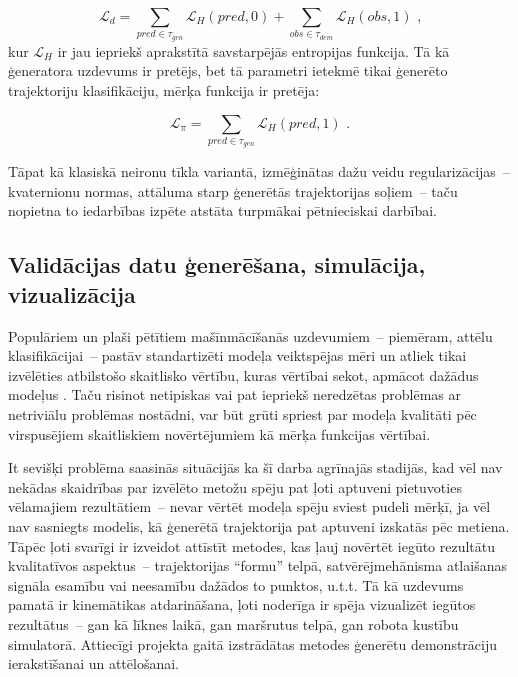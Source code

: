 \documentclass[12pt, a4paper]{article}
\numberwithin{equation}{section} %
\begin{document}
\begin{equation}
    \mathcal{L}_{d} = \sum_{pred \in \tau_{gen}} \mathcal{L}_H(pred,0) + 
    \sum_{obs \in \tau_{dem}} \mathcal{L}_H(obs,1) 
\text{ ,}
\end{equation}
kur $\mathcal{L}_H$ ir jau iepriekš aprakstītā savstarpējās entropijas funkcija. Tā kā ģeneratora uzdevums ir pretējs, bet tā parametri ietekmē tikai ģenerēto trajektoriju klasifikāciju, mērķa funkcija ir pretēja:

\begin{equation}
    \mathcal{L}_{\pi} = \sum_{pred \in \tau_{gen}} \mathcal{L}_H(pred,1) 
\text{ .}
\end{equation}

Tāpat kā klasiskā neironu tīkla variantā, izmēģinātas dažu veidu regularizācijas~-- kvaternionu normas, attāluma starp ģenerētās trajektorijas soļiem~-- taču nopietna to iedarbības izpēte atstāta turpmākai pētnieciskai darbībai.

\subsection{Validācijas datu ģenerēšana, simulācija, vizualizācija}

Populāriem un plaši pētītiem mašīnmācīšanās uzdevumiem~-- piemēram, attēlu klasifikācijai~-- pastāv standartizēti modeļa veiktspējas mēri un atliek tikai izvēlēties atbilstošo skaitlisko vērtību, kuras vērtībai sekot, apmācot dažādus modeļus \cite{tf_img_tutorial}. Taču risinot netipiskas vai pat iepriekš neredzētas problēmas ar netriviālu problēmas nostādni, var būt grūti spriest par modeļa kvalitāti pēc virspusējiem skaitliskiem novērtējumiem kā mērķa funkcijas vērtībai. 

It sevišķi problēma saasinās situācijās ka šī darba agrīnajās stadijās, kad vēl nav nekādas skaidrības par izvēlēto metožu spēju pat ļoti aptuveni pietuvoties vēlamajiem rezultātiem~-- nevar vērtēt modeļa spēju sviest pudeli mērķī, ja vēl nav sasniegts modelis, kā ģenerētā trajektorija pat aptuveni izskatās pēc metiena. Tāpēc ļoti svarīgi ir izveidot attīstīt metodes, kas ļauj novērtēt iegūto rezultātu kvalitatīvos aspektus~-- trajektorijas ``formu'' telpā, satvērējmehānisma atlaišanas signāla esamību vai neesamību dažādos to punktos, u.t.t. Tā kā uzdevums pamatā ir kinemātikas atdarināšana, ļoti noderīga ir spēja vizualizēt iegūtos rezultātus~-- gan kā līknes laikā, gan maršrutus telpā, gan robota kustību simulatorā. Attiecīgi projekta gaitā izstrādātas metodes ģenerētu demonstrāciju ierakstīšanai un attēlošanai.
\end{document}
